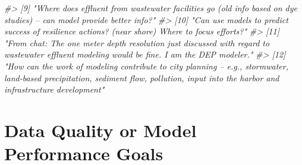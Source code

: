 \documentclass[
]{article}
\newenvironment{Shaded}{\begin{snugshade}}{\end{snugshade}}
\newcommand{\CommentTok}[1]{\textcolor[rgb]{0.56,0.35,0.01}{\textit{#1}}}
\begin{document}
\begin{Shaded}
\begin{Highlighting}[]
\CommentTok{\#\textgreater{}  [9] "Where does effluent from wastewater facilities go (old info based on dye studies) – can model provide better info?"                                                                                                                                             }
\CommentTok{\#\textgreater{} [10] "Can use models to predict success of resilience actions? (near shore)  Where to focus efforts?"                                                                                                                                                                 }
\CommentTok{\#\textgreater{} [11] "From chat:  The one meter depth resolution just discussed with regard to wastewater effluent modeling would be fine. I am the DEP modeler."                                                                                                                     }
\CommentTok{\#\textgreater{} [12] "How can the work of modeling contribute to city planning – e.g., stormwater, land{-}based precipitation, sediment flow, pollution, input into the harbor and infrastructure development"}
\end{Highlighting}
\end{Shaded}

\hypertarget{data-quality-or-model-performance-goals}{%
\section{Data Quality or Model Performance
Goals}\label{data-quality-or-model-performance-goals}}
\end{document}
